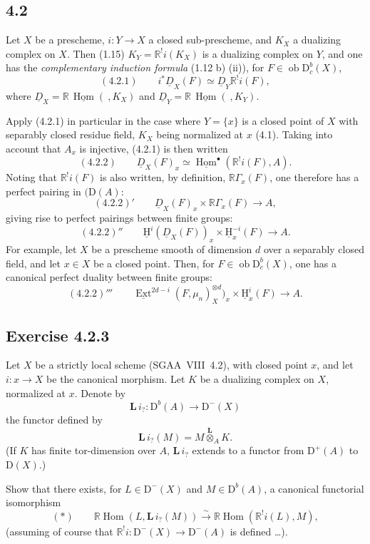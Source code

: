 \documentclass[11pt]{article}
\providecommand{\uH}{\underline{\mathrm H}}
\providecommand{\uExt}{\underline{\Ext}}
\providecommand{\uHom}{\underline{\Hom}}
\DeclareMathOperator{\Hom}{Hom}
\DeclareMathOperator{\Ext}{Ext}
\newcommand{\D}{\mathrm{D}}
\newcommand{\ob}{\operatorname{ob}}
\providecommand{\Hom}{\operatorname{Hom}}
\providecommand{\ob}{\operatorname{ob}}
\providecommand{\Hom}{\operatorname{Hom}}
\begin{document}
\subsection*{4.2}
Let $X$ be a prescheme, $i:Y\to X$ a closed sub-prescheme, and $K_X$ a dualizing complex on $X$. Then (1.15) $K_Y=\mathbb{R}^{!}i(K_X)$ is a dualizing complex on $Y$, and one has the \emph{complementary induction formula} (1.12 b) (ii)), for $F\in \ob\D_c^b(X)$,
\[
(4.2.1)\qquad i^*\underline{D}_X(F)\simeq\underline{D}_Y\mathbb{R}^{!}i(F),
\]
where $\underline{D}_X=\mathbb{R}\,\underline{\Hom}(\ ,K_X)$ and $\underline{D}_Y=\mathbb{R}\,\underline{\Hom}(\ ,K_Y)$.

Apply (4.2.1) in particular in the case where $Y=\{x\}$ is a closed point of $X$ with separably closed residue field, $K_X$ being normalized at $x$ (4.1). Taking into account that $A_x$ is injective, (4.2.1) is then written
\[
(4.2.2)\qquad \underline{D}_X(F)_x\simeq\uHom^{\bullet}(\mathbb{R}^{!}i(F),A).
\]
Noting that $\mathbb{R}^{!}i(F)$ is also written, by definition, $\mathbb{R}\Gamma_x(F)$, one therefore has a perfect pairing in $(\D(A)$:
\[
(4.2.2)'\qquad \underline{D}_X(F)_x\times \mathbb{R}\Gamma_x(F)\longrightarrow A,
\]
giving rise to perfect pairings between finite groups:
\[
(4.2.2)''\qquad \uH^i(\underline{D}_X(F))_x\times \uH_x^{-i}(F)\longrightarrow A.
\]
For example, let $X$ be a prescheme smooth of dimension $d$ over a separably closed field, and let $x\in X$ be a closed point. Then, for $F\in\ob\D_c^b(X)$, one has a canonical perfect duality between finite groups:
\[
(4.2.2)'''\qquad \uExt^{2d-i}(F,\mu_n)_X^{\otimes d})_x\times \uH_x^i(F)\longrightarrow A.
\]

\subsection*{Exercise 4.2.3}
Let $X$ be a strictly local scheme (SGAA~VIII~4.2), with closed point $x$, and let $i:x\to X$ be the canonical morphism. Let $K$ be a dualizing complex on $X$, normalized at $x$. Denote by
\[
\mathbf L\, i_? : \D^b(A)\longrightarrow \D^-(X)
\]
the functor defined by
\[
\mathbf L\, i_?(M)=M\overset{\mathbf L}{\otimes}_A K.
\]
(If $K$ has finite tor-dimension over $A$, $\mathbf L\, i_?$ extends to a functor from $\D^+(A)$ to $\D(X)$.)

Show that there exists, for $L\in\D^-(X)$ and $M\in\D^b(A)$, a canonical functorial isomorphism
\[
(*)\qquad \mathbb{R}\Hom(L,\mathbf L\, i_?(M))\xrightarrow{\sim}\mathbb{R}\Hom(\mathbb{R}^{!}i(L),M),
\]
(assuming of course that $\mathbb{R}^{!}i:\D^-(X)\to\D^-(A)$ is defined \dots).
\end{document}
